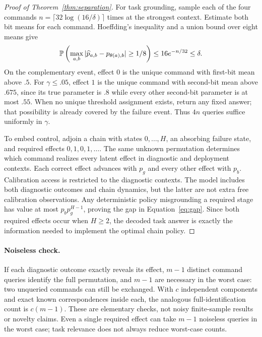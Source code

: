 \begin{proof}[Proof of Theorem~\ref{thm:separation}]
For task grounding, sample each of the four commands $n=\lceil32\log(16/\delta)\rceil$ times at the strongest context. Estimate both bit means for each command. Hoeffding's inequality and a union bound over eight means give
\begin{equation}
\mathbb P\left(\max_{a,b}|\widehat p_{a,b}-p_{\theta(a),b}|\ge1/8\right)
\le16e^{-n/32}\le\delta.
\end{equation}
On the complementary event, effect $0$ is the unique command with first-bit mean above $.5$. For $\gamma\le .05$, effect $1$ is the unique command with second-bit mean above $.675$, since its true parameter is $.8$ while every other second-bit parameter is at most $.55$. When no unique threshold assignment exists, return any fixed answer; that possibility is already covered by the failure event. Thus $4n$ queries suffice uniformly in $\gamma$.

To embed control, adjoin a chain with states $0,\ldots,H$, an absorbing failure state, and required effects $0,1,0,1,\ldots$. The same unknown permutation determines which command realizes every latent effect in diagnostic and deployment contexts. Each correct effect advances with $p_g$ and every other effect with $p_b$. Calibration access is restricted to the diagnostic contexts. The model includes both diagnostic outcomes and chain dynamics, but the latter are not extra free calibration observations. Any deterministic policy misgrounding a required stage has value at most $p_b p_g^{H-1}$, proving the gap in Equation~\eqref{eq:gap}. Since both required effects occur when $H\ge2$, the decoded task answer is exactly the information needed to implement the optimal chain policy.
\end{proof}

\paragraph{Noiseless check.}
If each diagnostic outcome exactly reveals its effect, $m-1$ distinct command queries identify the full permutation, and $m-1$ are necessary in the worst case: two unqueried commands can still be exchanged. With $c$ independent components and exact known correspondences inside each, the analogous full-identification count is $c(m-1)$. These are elementary checks, not noisy finite-sample results or novelty claims. Even a single required effect can take $m-1$ noiseless queries in the worst case; task relevance does not always reduce worst-case counts.

